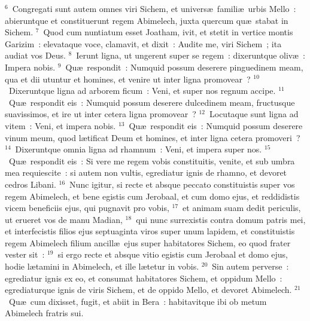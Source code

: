 ${}^{6}$~Congregati sunt autem omnes viri Sichem, et univers\ae\ famili\ae\ urbis Mello~: abieruntque et constituerunt regem Abimelech, juxta quercum qu\ae\ stabat in Sichem.
${}^{7}$~Quod cum nuntiatum esset Joatham, ivit, et stetit in vertice montis Garizim~: elevataque voce, clamavit, et dixit~: Audite me, viri Sichem~; ita audiat vos Deus.
${}^{8}$~Ierunt ligna, ut ungerent super se regem~: dixeruntque oliv\ae~: Impera nobis.
${}^{9}$~Qu\ae\ respondit~: Numquid possum deserere pinguedinem meam, qua et dii utuntur et homines, et venire ut inter ligna promovear~?
${}^{10}$~Dixeruntque ligna ad arborem ficum~: Veni, et super nos regnum accipe.
${}^{11}$~Qu\ae\ respondit eis~: Numquid possum deserere dulcedinem meam, fructusque suavissimos, et ire ut inter cetera ligna promovear~?
${}^{12}$~Locutaque sunt ligna ad vitem~: Veni, et impera nobis.
${}^{13}$~Qu\ae\ respondit eis~: Numquid possum deserere vinum meum, quod l\ae tificat Deum et homines, et inter ligna cetera promoveri~?
${}^{14}$~Dixeruntque omnia ligna ad rhamnum~: Veni, et impera super nos.
${}^{15}$~Qu\ae\ respondit eis~: Si vere me regem vobis constituitis, venite, et sub umbra mea requiescite~: si autem non vultis, egrediatur ignis de rhamno, et devoret cedros Libani.
${}^{16}$~Nunc igitur, si recte et absque peccato constituistis super vos regem Abimelech, et bene egistis cum Jerobaal, et cum domo ejus, et reddidistis vicem beneficiis ejus, qui pugnavit pro vobis,
${}^{17}$~et animam suam dedit periculis, ut erueret vos de manu Madian,
${}^{18}$~qui nunc surrexistis contra domum patris mei, et interfecistis filios ejus septuaginta viros super unum lapidem, et constituistis regem Abimelech filium ancill\ae\ ejus super habitatores Sichem, eo quod frater vester sit~:
${}^{19}$~si ergo recte et absque vitio egistis cum Jerobaal et domo ejus, hodie l\ae tamini in Abimelech, et ille l\ae tetur in vobis.
${}^{20}$~Sin autem perverse~: egrediatur ignis ex eo, et consumat habitatores Sichem, et oppidum Mello~: egrediaturque ignis de viris Sichem, et de oppido Mello, et devoret Abimelech.
${}^{21}$~Qu\ae\ cum dixisset, fugit, et abiit in Bera~: habitavitque ibi ob metum Abimelech fratris sui.


